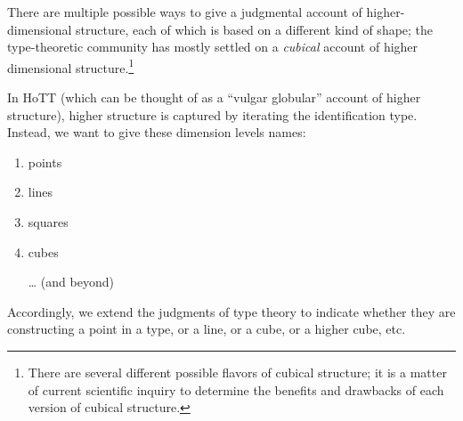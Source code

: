 \documentclass{article}
\begin{document}
There are multiple possible ways to give a judgmental account of
higher-dimensional structure, each of which is based on a different
kind of shape; the type-theoretic community has mostly settled on a
\emph{cubical} account of higher dimensional structure.\footnote{There
  are several different possible flavors of cubical structure; it is a
  matter of current scientific inquiry to determine the benefits and
  drawbacks of each version of cubical structure.}

In HoTT (which can be thought of as a ``vulgar globular'' account of
higher structure), higher structure is captured by iterating the
identification type. Instead, we want to give these dimension levels
names:

\begin{enumerate}
\item points
\item lines
\item squares
\item cubes
\item[\ldots] (and beyond)
\end{enumerate}

Accordingly, we extend the judgments of type theory to indicate
whether they are constructing a point in a type, or a line, or a cube,
or a higher cube, etc.



\nocite{HoTTBook:13}


\end{document}
